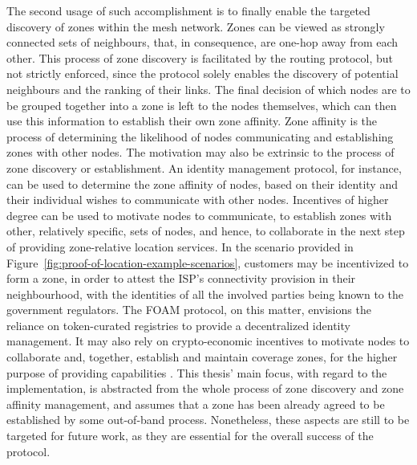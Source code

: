 The second usage of such accomplishment is to finally enable the targeted discovery of zones within the mesh network. Zones can be viewed as strongly connected sets of neighbours, that, in consequence, are one-hop away from each other. This process of zone discovery is facilitated by the routing protocol, but not strictly enforced, since the protocol solely enables the discovery of potential neighbours and the ranking of their links. The final decision of which nodes are to be grouped together into a zone is left to the nodes themselves, which can then use this information to establish their own zone affinity. Zone affinity is the process of determining the likelihood of nodes communicating and establishing zones with other nodes. The motivation may also be extrinsic to the process of zone discovery or establishment. An identity management protocol, for instance, can be used to determine the zone affinity of nodes, based on their identity and their individual wishes to communicate with other nodes. Incentives of higher degree can be used to motivate nodes to communicate, to establish zones with other, relatively specific, sets of nodes, and hence, to collaborate in the next step of providing zone-relative location services. In the scenario provided in Figure~\ref{fig:proof-of-location-example-scenarios}, customers may be incentivized to form a zone, in order to attest the ISP's connectivity provision in their neighbourhood, with the identities of all the involved parties being known to the government regulators. The FOAM protocol, on this matter, envisions the reliance on token-curated registries to provide a decentralized identity management. It may also rely on crypto-economic incentives to motivate nodes to collaborate and, together, establish and maintain coverage zones, for the higher purpose of providing \pol{} capabilities \cite{foam-white-paper}. This thesis' main focus, with regard to the \poc{} implementation, is abstracted from the whole process of zone discovery and zone affinity management, and assumes that a zone has been already agreed to be established by some out-of-band process. Nonetheless, these aspects are still to be targeted for future work, as they are essential for the overall success of the protocol.

